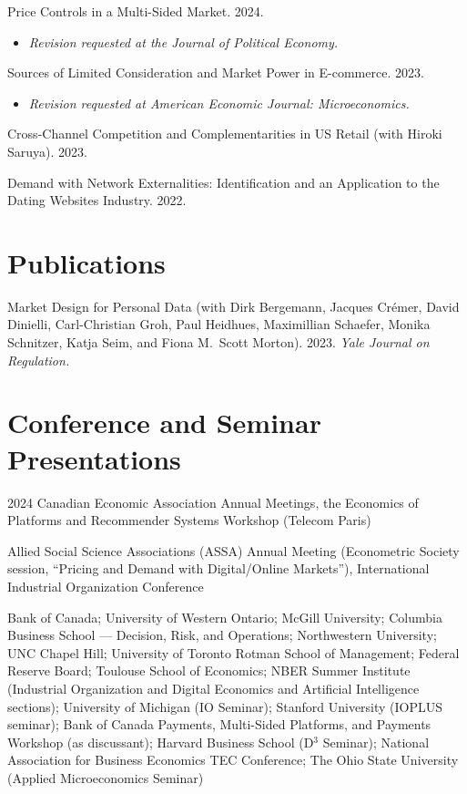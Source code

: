 \documentclass[11pt]{article} %
\begin{document}
Price Controls in a Multi-Sided Market. 2024. 
\begin{itemize}
	\item \textit{Revision requested at the Journal of Political Economy.}
\end{itemize}

\medskip

Sources of Limited Consideration and Market Power in E-commerce. 2023.
\begin{itemize}
	\item \textit{Revision requested at American Economic Journal: Microeconomics.}
\end{itemize}

\medskip

Cross-Channel Competition and Complementarities in US Retail
(with Hiroki Saruya). 2023.

\medskip

 
Demand with Network Externalities: 
Identification and an Application to the Dating Websites Industry. 2022.




\section*{Publications}

Market Design for Personal Data
(with Dirk Bergemann, Jacques Cr\'{e}mer, David Dinielli, 
Carl-Christian Groh, Paul Heidhues, Maximillian Schaefer, 
Monika Schnitzer, Katja Seim, and Fiona M.\ Scott Morton).
2023. \textit{Yale Journal on Regulation.}




\section*{Conference and Seminar Presentations}

 2024 Canadian Economic Association Annual Meetings,
		the Economics of Platforms and Recommender Systems Workshop (Telecom Paris)

 Allied Social Science Associations (ASSA) Annual Meeting
	(Econometric Society session, ``Pricing and Demand with Digital/Online Markets''),
	International Industrial Organization Conference
	
 Bank of Canada; University of Western Ontario;
	McGill University; Columbia Business School --- Decision, Risk, and Operations;
	Northwestern University; UNC Chapel Hill; University of Toronto Rotman School
	of Management; Federal Reserve Board; Toulouse School of Economics;
	NBER Summer Institute (Industrial Organization and Digital Economics and Artificial
	Intelligence sections); University of Michigan (IO Seminar);
	Stanford University (IOPLUS seminar); Bank of Canada Payments, Multi-Sided Platforms, and Payments
	Workshop (as discussant); 
	Harvard Business School (D${}^3$ Seminar); 
	National Association for Business Economics TEC Conference;
	The Ohio State University (Applied Microeconomics Seminar)
\end{document}
